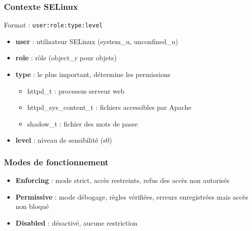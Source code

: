 \documentclass[12pt,a4paper]{article}
\begin{document}

\subsubsection{Contexte SELinux}
Format : \texttt{user:role:type:level}
\begin{itemize}
    \item \textbf{user} : utilisateur SELinux (system\_u, unconfined\_u) %
    \item \textbf{role} : r\^ole (object\_r pour objets) %
    \item \textbf{type} : le plus important, d\'etermine les permissions %
    \begin{itemize}
        \item httpd\_t : processus serveur web %
        \item httpd\_sys\_content\_t : fichiers accessibles par Apache %
        \item shadow\_t : fichier des mots de passe %
    \end{itemize}
    \item \textbf{level} : niveau de sensibilit\'e (s0) %
\end{itemize}


\subsubsection{Modes de fonctionnement}
\begin{itemize}
    \item \textbf{Enforcing} : mode strict, acc\`es restreints, refus des acc\`es non autoris\'es %
    \item \textbf{Permissive} : mode d\'ebogage, r\`egles v\'erifi\'ees, erreurs enregistr\'ees mais acc\`es non bloqu\'e %
    \item \textbf{Disabled} : d\'esactiv\'e, aucune restriction %
\end{itemize}
\end{document}
